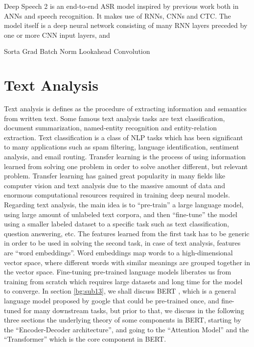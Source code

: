 
Deep Speech 2 is an end-to-end \ac{ASR} model inspired by previous work both in \ac{ANN}s and speech recognition. It makes use of \ac{RNN}s, \ac{CNN}s and \ac{CTC}. The model itself is a deep neural network consisting of many \ac{RNN} layers preceded by one or more \ac{CNN} input layers, and  



Sorta Grad
Batch Norm
Lookahead Convolution




\section{Text Analysis} \label{bg:s4}

Text analysis is defines as the procedure of extracting information and semantics from written text. Some famous text analysis tasks are text classification, document summarization, named-entity recognition and entity-relation extraction. 
Text classification is a class of \ac{NLP} tasks which has been significant to many applications such as spam filtering, language identification, sentiment analysis, and email routing. 
Transfer learning is the process of using information learned from solving one problem in order to solve another different, but relevant problem. 
Transfer learning has gained great popularity in many fields like computer vision and text analysis due to the massive amount of data and enormous computational resources required in training deep neural models. 
Regarding text analysis, the main idea is to \enquote{pre-train} a large language model, using large amount of unlabeled text corpora, and then \enquote{fine-tune} the model using a smaller labeled dataset to a specific task such as text classification, question answering, etc. 
The features learned from the first task has to be generic in order to be used in solving the second task, in case of text analysis, features are \enquote{word embeddings}. 
Word embeddings map words to a high-dimensional vector space, where different words with similar meanings are grouped together in the vector space. Fine-tuning pre-trained language models liberates us from training from scratch which requires large datasets and long time for the model to converge. 
In section \ref{bg:sub13}, we shall discuss \ac{BERT} \cite{devlin2018bert}, which is a general language model proposed by google that could be pre-trained once, and fine-tuned for many downstream tasks, but prior to that, we discuss in the following three sections the underlying theory of some components in \ac{BERT}, starting by the \enquote{Encoder-Decoder architecture}, and going to the \enquote{Attention Model} and the \enquote{Transformer} which is the core component in \ac{BERT}. 

